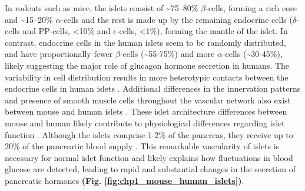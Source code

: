 \par In rodents such as mice, the islets consist of \textasciitilde75–80\% $\beta$-cells, forming a rich core and \textasciitilde15–20\% $\alpha$-cells and the rest is made up by the remaining endocrine cells ($\delta$-cells and PP-cells, <10\% and $\epsilon$-cells, <1\%), forming the mantle of the islet. In contrast, endocrine cells in the human islets seem to be randomly distributed, and have proportionally fewer $\beta$-cells (\textasciitilde55-75\%) and more $\alpha$-cells (\textasciitilde30-45\%), likely suggesting the major role of glucagon hormone secretion in humans. The variability in cell distribution results in more heterotypic contacts between the endocrine cells in human islets \textbf{\cite{walker_human_2021}}. %
Additional differences in the innervation patterns and presence of smooth muscle cells throughout the vascular network also exist between mouse and human islets \textbf{\cite{rodriguez-diaz_autonomic_2011}}. %
These islet architecture differences between mouse and human likely contribute to physiological differences regarding islet function \textbf{\cite{cabrera_unique_2006}}. %
Although the islets comprise 1-2\% of the pancreas, they receive up to 20\% of the pancreatic blood supply \textbf{\cite{muratore_vascular_2021,jansson_glucose-induced_1986}}. 
This remarkable vascularity of islets is necessary for normal islet function and likely explains how fluctuations in blood glucose are %
detected, %
leading to rapid and %
substantial changes in the secretion of pancreatic hormones \textbf{(Fig. \ref{fig:chp1_mouse_human_islets})}.\\

